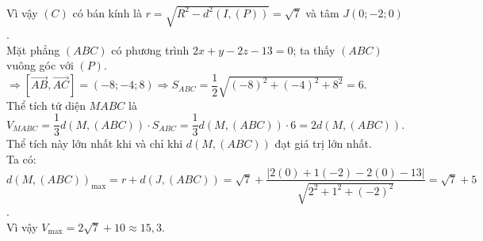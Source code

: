 \begin{ex}
{\\Vì vậy $(C)$ có bán kính là $r = \sqrt{R^2 - d^2(I,(P))} = \sqrt{7}$ và tâm $J(0;-2;0)$.
\\Mặt phẳng $(ABC)$ có phương trình $2x+y-2z-13=0$; ta thấy $(ABC)$ vuông góc với $(P)$.\\
$ \Rightarrow [\vec{AB},\vec{AC}] = (-8;-4;8) \Rightarrow S_{ABC} = \dfrac{1}{2}\sqrt{(-8)^2+(-4)^2+8^2} = 6$.
\\Thể tích tứ diện $MABC$ là $V_{MABC} = \dfrac{1}{3}d(M,(ABC)) \cdot S_{ABC} = \dfrac{1}{3}d(M,(ABC)) \cdot 6 = 2d(M,(ABC))$.
\\Thể tích này lớn nhất khi và chỉ khi $d(M,(ABC))$ đạt giá trị lớn nhất.
\\Ta có: $d(M,(ABC))_{\max} = r + d(J,(ABC)) = \sqrt{7} + \dfrac{|2(0) + 1(-2) - 2(0) - 13|}{\sqrt{2^2+1^2+(-2)^2}} = \sqrt{7} + 5$.
\\Vì vậy $V_{\max} = 2\sqrt{7} + 10 \approx 15,3$.}
\end{ex}
